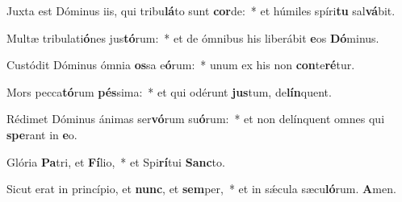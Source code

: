 \item Juxta est Dóminus iis, qui tribu\textbf{lá}to sunt \textbf{cor}de:~* et húmiles spíri\textbf{tu} sal\textbf{vá}bit.
\item Multæ tribulati\textbf{ó}nes jus\textbf{tó}rum:~* et de ómnibus his liberábit \textbf{e}os \textbf{Dó}minus.
\item Custódit Dóminus ómnia \textbf{os}sa e\textbf{ó}rum:~* unum ex his non \textbf{con}te\textbf{ré}tur.
\item Mors pecca\textbf{tó}rum \textbf{pés}sima:~* et qui odérunt \textbf{jus}tum, de\textbf{lín}quent.
\item Rédimet Dóminus ánimas ser\textbf{vó}rum su\textbf{ó}rum:~* et non delínquent omnes qui \textbf{spe}rant in \textbf{e}o.
\item Glória \textbf{Pa}tri, et \textbf{Fí}lio,~* et Spi\textbf{rí}tui \textbf{Sanc}to.
\item Sicut erat in princípio, et \textbf{nunc}, et \textbf{sem}per,~* et in sǽcula sæcu\textbf{ló}rum. \textbf{A}men.
